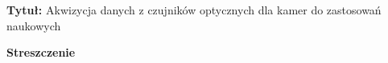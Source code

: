 
\thispagestyle{empty}
\setcounter{savepage}{\thepage}

\begin{center}

\large{\textbf{Tytuł:} Akwizycja danych z czujników optycznych dla kamer do zastosowań naukowych}

\vspace{0.5cm}
\textbf{Streszczenie}

\end{center}
%
%
%
%
%
%
%
\cleardoublepage
